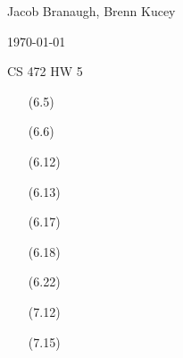 \documentclass[letterpaper,10pt,titlepage]{article}
\def\name{Jacob Branaugh, Brenn Kucey}
\begin{document}
\hfill \name

\hfill \today

\hfill CS 472 HW 5

\begin{enumerate}
	\item[(6.5)] 
	\item[\textbullet] 

	\item[(6.6)] 
	\item[\textbullet] 

	\item[(6.12)] 
	\item[\textbullet] 

	\item[(6.13)] 
	\item[\textbullet] 

	\item[(6.17)] 
	\item[\textbullet] 

	\item[(6.18)] 
	\item[\textbullet] 

	\item[(6.22)] 
	\item[\textbullet] 

	\item[(7.12)] 
	\item[\textbullet] 

	\item[(7.15)] 
	\item[\textbullet] 

\end{enumerate}
\end{document}
